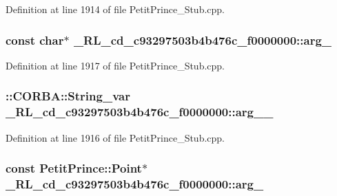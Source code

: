 Definition at line 1914 of file Petit\+Prince\+\_\+\+Stub.\+cpp.

\subsubsection[{\texorpdfstring{arg\+\_\+0}{arg_0}}]{\setlength{\rightskip}{0pt plus 5cm}const char$\ast$ \+\_\+R\+L\+\_\+cd\+\_\+c93297503b4b476c\+\_\+f0000000\+::arg\+\_}\hypertarget{class__0_r_l__cd__c93297503b4b476c__f0000000_acfd83eca6ef903b69b6c90c5b2f5bba3}{}\label{class__0_r_l__cd__c93297503b4b476c__f0000000_acfd83eca6ef903b69b6c90c5b2f5bba3}


Definition at line 1917 of file Petit\+Prince\+\_\+\+Stub.\+cpp.

\subsubsection[{\texorpdfstring{arg\+\_\+0\+\_\+}{arg_0_}}]{\setlength{\rightskip}{0pt plus 5cm}\+::C\+O\+R\+B\+A\+::\+String\+\_\+var \+\_\+R\+L\+\_\+cd\+\_\+c93297503b4b476c\+\_\+f0000000\+::arg\+\_\+\_\+}\hypertarget{class__0_r_l__cd__c93297503b4b476c__f0000000_a42f779a55d1f4fd887c74846dd62c7ee}{}\label{class__0_r_l__cd__c93297503b4b476c__f0000000_a42f779a55d1f4fd887c74846dd62c7ee}


Definition at line 1916 of file Petit\+Prince\+\_\+\+Stub.\+cpp.

\subsubsection[{\texorpdfstring{arg\+\_\+1}{arg_1}}]{\setlength{\rightskip}{0pt plus 5cm}const Petit\+Prince\+::\+Point$\ast$ \+\_\+R\+L\+\_\+cd\+\_\+c93297503b4b476c\+\_\+f0000000\+::arg\+\_}\hypertarget{class__0_r_l__cd__c93297503b4b476c__f0000000_a5eaa35de47a96874f0d9a7ad3b791900}{}\label{class__0_r_l__cd__c93297503b4b476c__f0000000_a5eaa35de47a96874f0d9a7ad3b791900}


